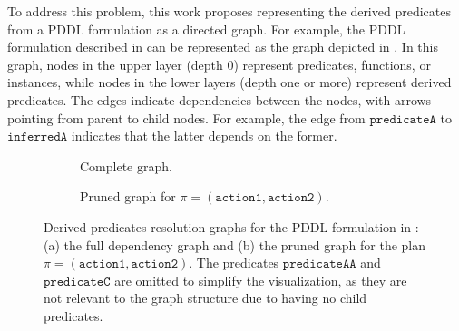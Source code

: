 To address this problem, this work proposes representing the derived predicates from a PDDL formulation as a directed graph. For example, the PDDL formulation described in  can be represented as the graph depicted in . In this graph, nodes in the upper layer (depth 0) represent predicates, functions, or instances, while nodes in the lower layers (depth one or more) represent derived predicates. The edges indicate dependencies between the nodes, with arrows pointing from parent to child nodes. For example, the edge from $\texttt{predicateA}$ to $\texttt{inferredA}$ indicates that the latter depends on the former.

\begin{figure}[tbp]
    \centering
    \begin{subfigure}[t]{0.48\linewidth}
        \vspace{0pt} %
        \centering
        \resizebox{\linewidth}{!}{}
        \caption{Complete graph.}%
        \label{planta:fig:derived_graph}
    \end{subfigure}
    \hfill
    \begin{subfigure}[t]{0.48\linewidth}
        \vspace{0pt} %
        \centering
        \resizebox{\linewidth}{!}{}
        \caption{Pruned graph for $\pi=(\texttt{action1}, \texttt{action2})$.}%
        \label{planta:fig:pruned_graph}
    \end{subfigure}
    \caption{Derived predicates resolution graphs for the PDDL formulation in : (a) the full dependency graph and (b) the pruned graph for the plan $\pi = (\texttt{action1}, \texttt{action2})$. The predicates $\texttt{predicateAA}$ and $\texttt{predicateC}$ are omitted to simplify the visualization, as they are not relevant to the graph structure due to having no child predicates.}%
    \label{planta:fig:derived_graphs_combined}
\end{figure}

